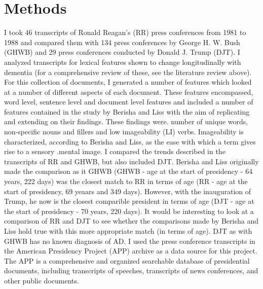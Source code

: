 \documentclass[10pt, letterpaper, twoside, openany]{book}
\begin{document}
\section{Methods}
I took 46 transcripts of Ronald Reagan’s (RR) press conferences from 1981 to 1988 and compared them with 134 press conferences by George H. W. Bush (GHWB) and 29 press conferences conducted by Donald J. Trump (DJT).  I analyzed transcripts for lexical features shown to change longitudinally with dementia  (for a comprehensive review of these, see the literature review above). For this collection of documents, I generated a number of features which looked at a number of different aspects of each document. These features encompassed, word level, sentence level and document level features and included a number of features contained in the study by Berisha and Liss with the aim of replicating and extending on their findings. These findings were. number of unique words, non-specific nouns and fillers and low imageability (LI) verbs. Imageability is characterized, according to Berisha and Liss, as the ease with which a term gives rise to a sensory .mental image. I compared the trends described in the transcripts of RR and GHWB, but also included DJT. Berisha and Liss originally made the comparison as it GHWB (GHWB - age at the start of presidency - 64 years, 222 days) was the closest match to RR in terms of age (RR  - age at the start of presidency, 69 yeaars and 349 days). However, with the inauguration of Trump, he now is the closest comparible president in terms of age (DJT - age at the start of presidency - 70 years, 220 days). It would be interesting to look at a comparison of RR and DJT to see whether the comparisons made by Berisha and Liss hold true with this more appropriate match (in terms of age). DJT as with GHWB has no known diagnosis of AD. I used the press conference transcripts in the American Presidency Project (APP) archive as a data source for this project. The APP is a comprehensive and organized searchable database of presidential documents, including transcripts of speeches, transcripts of news conferences, and other public documents.
\end{document}

